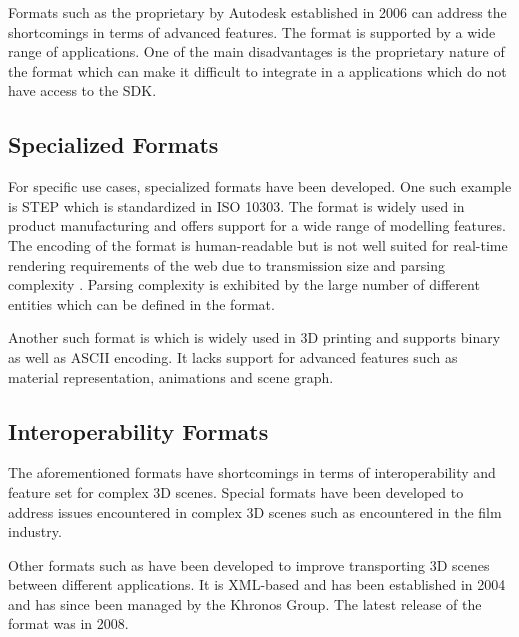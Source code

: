 Formats such as the proprietary  by Autodesk established in 2006 can address the shortcomings in terms of advanced features. The format is supported by a wide range of applications. One of the main disadvantages is the proprietary nature of the format  which can make it difficult to integrate in a applications which do not have access to the SDK.

\subsection*{Specialized Formats}
\label{ch:specializedFormats}

For specific use cases, specialized formats have been developed. One such example is \gls{STEP} which is standardized in ISO 10303. The format is widely used in product manufacturing and offers support for a wide range of modelling features. The  encoding of the format is human-readable but is not well suited for real-time rendering requirements of the web due to transmission size and parsing complexity \cite{marjudi2010StepIgesreview}. Parsing complexity is exhibited by the large number of different entities which can be defined in the format.

Another such format is  which is widely used in 3D printing and supports binary as well as \gls{ASCII} encoding. It lacks support for advanced features such as material representation, animations and scene graph.

\subsection*{Interoperability Formats}

The aforementioned formats have shortcomings in terms of interoperability and feature set for complex 3D scenes. Special formats have been developed to address issues encountered in complex 3D scenes such as encountered in the film industry.

Other formats such as  have been developed to improve transporting 3D scenes between different applications. It is XML-based and has been established in 2004 and has since been managed by the \gls{Khronos Group}. The latest release of the format was in 2008.

